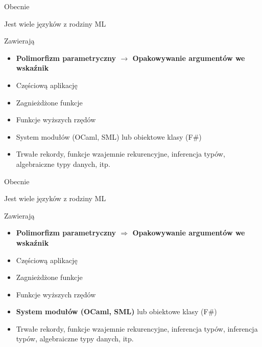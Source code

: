 \documentclass{beamer}
\begin{document}
\begin{frame}{Obecnie}
\begin{itemize}
    \item {
        Jest wiele języków z rodziny ML
    \item Zawierają
        \begin{itemize}
            \item \textbf{Polimorfizm parametryczny $\rightarrow$ Opakowywanie 
            argumentów we wskaźnik}
            \item Częściową aplikację
            \item Zagnieżdżone funkcje 
            \item Funkcje wyższych rzędów 
            \item System modułów (OCaml, SML) lub obiektowe klasy (F\#)
            \item Trwałe rekordy, funkcje wzajemnie rekurencyjne, 
            inferencja typów, algebraiczne typy danych, itp.
        \end{itemize}
    }
\end{itemize}
\end{frame}

\begin{frame}{Obecnie}
\begin{itemize}
    \item {
        Jest wiele języków z rodziny ML
    \item Zawierają
        \begin{itemize}
            \item \textbf{Polimorfizm parametryczny $\Rightarrow$ Opakowywanie 
            argumentów we wskaźnik}
            \item Częściową aplikację
            \item Zagnieżdżone funkcje 
            \item Funkcje wyższych rzędów 
            \item \textbf{System modułów (OCaml, SML)} lub obiektowe klasy (F\#)
            \item Trwałe rekordy, funkcje wzajemnie rekurencyjne, 
            inferencja typów, 
            inferencja typów, algebraiczne typy danych, itp.
        \end{itemize}
    }
\end{itemize}
\end{frame}
\end{document}
